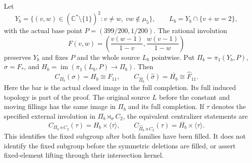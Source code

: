 \label{stmt:B87}
Let
\[
 Y_b=\{(v,w)\in(\mathbb C^*\setminus\{1\})^2:
           v\ne w,\ vw\notin\mu _5\},\qquad
 L_b=Y_b\cap\{v+w=2\},
\]
with the actual base point $P=(399/200,1/200)$. The rational involution
\[
 F(v,w)=\left(\frac{v(w-1)}{1-v},
                    \frac{w(v-1)}{1-w}\right)
\]
preserves $Y_b$ and fixes $P$ and the whole source $L_b$ pointwise.
Put $\Pi_b=\pi _1(Y_b,P)$, $\sigma=F_*$, and
$H_b=\operatorname{im}(\pi _1(L_b,P)\to\Pi_b)$. Then
\begin{equation}\label{eq:B87-fixed}
 C_{\Pi_b}(\sigma)=H_b\cong F_{11},\qquad
 C_{\widehat\Pi_b}(\widehat\sigma)=\overline{H_b}
                                       \cong\widehat F_{11}.
\end{equation}
Here the bar is the actual closed image in the full completion. Its full
induced topology is part of the proof. The original source $L$ before the
constant and moving fillings has the same image in $\Pi_b$ and its full
completion. If $\tau$ denotes the specified external involution in
$\Pi_b\rtimes_\sigma C_2$, the equivalent centralizer statements are
\[
 C_{\Pi_b\rtimes C_2}(\tau)=H_b\times\langle\tau\rangle,
 \qquad
 C_{\widehat\Pi_b\rtimes C_2}(\tau)
                  =\overline{H_b}\times\langle\tau\rangle.
\]
This identifies the fixed subgroup after both families have been filled.
It does not identify the fixed subgroup before the symmetric deletions
are filled, or assert fixed-element lifting through their intersection
kernel.

